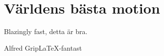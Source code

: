 \documentclass{dsekdoc}
\begin{document}
\setdate{\today}


\section*{Världens bästa motion}
Blazingly fast, detta är bra.

\medskip

\signature{För demokratin}{Alfred Grip}{\LaTeX-fantast}
\end{document}
